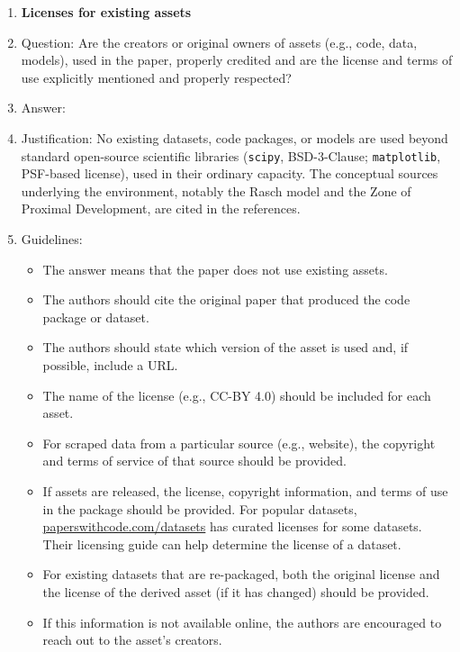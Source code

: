 \begin{enumerate}
\item {\bf Licenses for existing assets}
    \item[] Question: Are the creators or original owners of assets (e.g., code, data, models), used in the paper, properly credited and are the license and terms of use explicitly mentioned and properly respected?
    \item[] Answer: \answerNA{}
    \item[] Justification: No existing datasets, code packages, or models are used beyond standard open-source scientific libraries (\texttt{scipy}, BSD-3-Clause; \texttt{matplotlib}, PSF-based license), used in their ordinary capacity. The conceptual sources underlying the environment, notably the Rasch model and the Zone of Proximal Development, are cited in the references.
    \item[] Guidelines:
    \begin{itemize}
        \item The answer \answerNA{} means that the paper does not use existing assets.
        \item The authors should cite the original paper that produced the code package or dataset.
        \item The authors should state which version of the asset is used and, if possible, include a URL.
        \item The name of the license (e.g., CC-BY 4.0) should be included for each asset.
        \item For scraped data from a particular source (e.g., website), the copyright and terms of service of that source should be provided.
        \item If assets are released, the license, copyright information, and terms of use in the package should be provided. For popular datasets, \url{paperswithcode.com/datasets} has curated licenses for some datasets. Their licensing guide can help determine the license of a dataset.
        \item For existing datasets that are re-packaged, both the original license and the license of the derived asset (if it has changed) should be provided.
        \item If this information is not available online, the authors are encouraged to reach out to the asset's creators.
    \end{itemize}


\end{enumerate}
